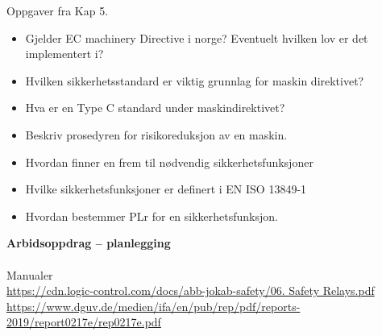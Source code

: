 	

\vskip 10pt 
Oppgaver fra Kap 5. 
\begin{itemize}[noitemsep]



	\item Gjelder EC machinery Directive i norge? Eventuelt hvilken lov er det implementert i?


	\item Hvilken sikkerhetsstandard er viktig grunnlag for maskin direktivet?

	\item Hva er en Type C standard under maskindirektivet?

	\item Beskriv prosedyren for risikoreduksjon av en maskin. 
%		
		

	\item Hvordan finner en frem til nødvendig sikkerhetsfunksjoner

	\item Hvilke sikkerhetsfunksjoner er definert i EN ISO 13849-1

	\item Hvordan bestemmer PLr for en sikkerhetsfunksjon. 

\end{itemize}
\vskip 10pt 
\textbf{Arbidsoppdrag -- planlegging}\\
\\
Manualer 
\\
\url {https://cdn.logic-control.com/docs/abb-jokab-safety/06. Safety Relays.pdf}
\\
\url {https://www.dguv.de/medien/ifa/en/pub/rep/pdf/reports-2019/report0217e/rep0217e.pdf}
\\

